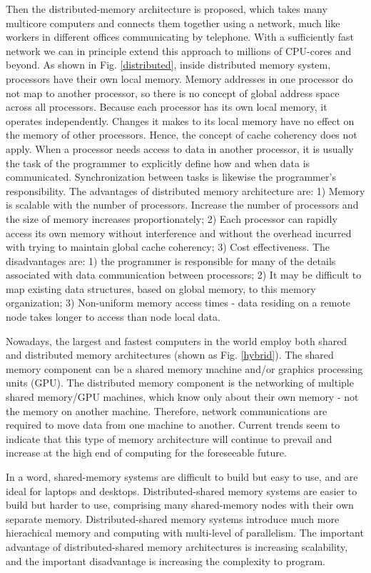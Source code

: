Then the distributed-memory architecture is proposed, which takes many multicore computers and connects them together using a network, much like workers in different offices communicating by telephone. With a sufficiently fast network we can in principle extend this approach to millions of CPU-cores and beyond. As shown in Fig. \ref{distributed}, inside distributed memory system, processors have their own local memory. Memory addresses in one processor do not map to another processor, so there is no concept of global address space across all processors. Because each processor has its own local memory, it operates independently. Changes it makes to its local memory have no effect on the memory of other processors. Hence, the concept of cache coherency does not apply. When a processor needs access to data in another processor, it is usually the task of the programmer to explicitly define how and when data is communicated. Synchronization between tasks is likewise the programmer's responsibility. The advantages of distributed memory architecture are: 1) Memory is scalable with the number of processors. Increase the number of processors and the size of memory increases proportionately; 2) Each processor can rapidly access its own memory without interference and without the overhead incurred with trying to maintain global cache coherency; 3) Cost effectiveness. The disadvantages are: 1) the programmer is responsible for many of the details associated with data communication between processors; 2) It may be difficult to map existing data structures, based on global memory, to this memory organization; 3) Non-uniform memory access times - data residing on a remote node takes longer to access than node local data.

Nowadays, the largest and fastest computers in the world employ both shared and distributed memory architectures (shown as Fig. \ref{hybrid}). The shared memory component can be a shared memory machine and/or graphics processing units (GPU). The distributed memory component is the networking of multiple shared memory/GPU machines, which know only about their own memory - not the memory on another machine. Therefore, network communications are required to move data from one machine to another. Current trends seem to indicate that this type of memory architecture will continue to prevail and increase at the high end of computing for the foreseeable future.

In a word, shared-memory systems are difficult to build but easy to use, and are ideal for laptops and desktops. Distributed-shared memory systems are easier to build but harder to use, comprising many shared-memory nodes with their own separate memory. Distributed-shared memory systems introduce much more hierachical memory and computing with multi-level of parallelism. The important advantage of distributed-shared memory architectures is increasing scalability, and the important disadvantage is increasing the complexity to program.

